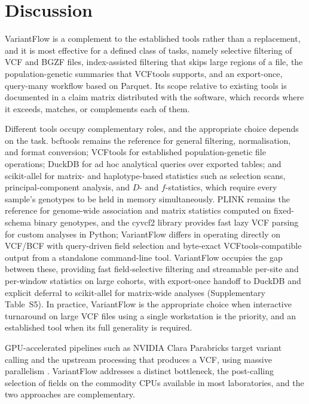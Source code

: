 \section{Discussion}

VariantFlow is a complement to the established tools rather than a replacement,
and it is most effective for a defined class of tasks, namely selective
filtering of VCF and BGZF files, index-assisted filtering that skips large
regions of a file, the population-genetic summaries that VCFtools supports, and
an export-once, query-many workflow based on Parquet. Its scope relative to
existing tools is documented in a claim matrix distributed with the software,
which records where it exceeds, matches, or complements each of them.

Different tools occupy complementary roles, and the appropriate choice depends
on the task. bcftools remains the reference for general filtering,
normalisation, and format conversion; VCFtools for established population-genetic
file operations; DuckDB for ad hoc analytical queries over exported tables; and
scikit-allel for matrix- and haplotype-based statistics such as selection scans,
principal-component analysis, and $D$- and $f$-statistics, which require every
sample's genotypes to be held in memory simultaneously. PLINK \citep{plink2}
remains the reference for genome-wide association and matrix statistics computed
on fixed-schema binary genotypes, and the cyvcf2 library \citep{cyvcf2} provides
fast lazy VCF parsing for custom analyses in Python; VariantFlow differs in
operating directly on VCF/BCF with query-driven field selection and byte-exact
VCFtools-compatible output from a standalone command-line tool. VariantFlow
occupies the
gap between these, providing fast field-selective filtering and streamable
per-site and per-window statistics on large cohorts, with export-once handoff to
DuckDB and explicit deferral to scikit-allel for matrix-wide analyses
(Supplementary Table~S5). In practice, VariantFlow is the appropriate choice
when interactive turnaround on large VCF files using a single workstation is
the priority, and an established tool when its full generality is required.

GPU-accelerated pipelines such as NVIDIA Clara Parabricks target variant calling
and the upstream processing that produces a VCF, using massive parallelism
\citep{parabricks}. VariantFlow addresses a distinct bottleneck, the
post-calling selection of fields on the commodity CPUs available in most
laboratories, and the two approaches are complementary.

